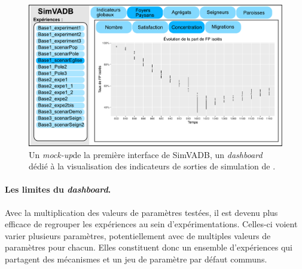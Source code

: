 \begin{figure}[H]
	\centering
	\includegraphics[width=\linewidth]{img/simvadb_mockup.pdf}
	\caption[Première interface de SimVADB, un \textit{dashboard} dédié à la visualisation des indicateurs de sorties de simulation de \simfeodal{}.]{Un \textit{mock-up}\footnotemark de la première interface de SimVADB, un \textit{dashboard} dédié à la visualisation des indicateurs de sorties de simulation de \simfeodal{}.}
	\label{fig:mockup_simvadb}
\end{figure}


\paragraph{Les limites du \textit{dashboard}.}
Avec la multiplication des valeurs de paramètres testées, il est devenu plus efficace de regrouper les expériences au sein d'expérimentations.
Celles-ci voient varier plusieurs paramètres, potentiellement avec de multiples valeurs de paramètres pour chacun.
Elles constituent donc un ensemble d'expériences qui partagent des mécanismes et un jeu de paramètre par défaut communs.

